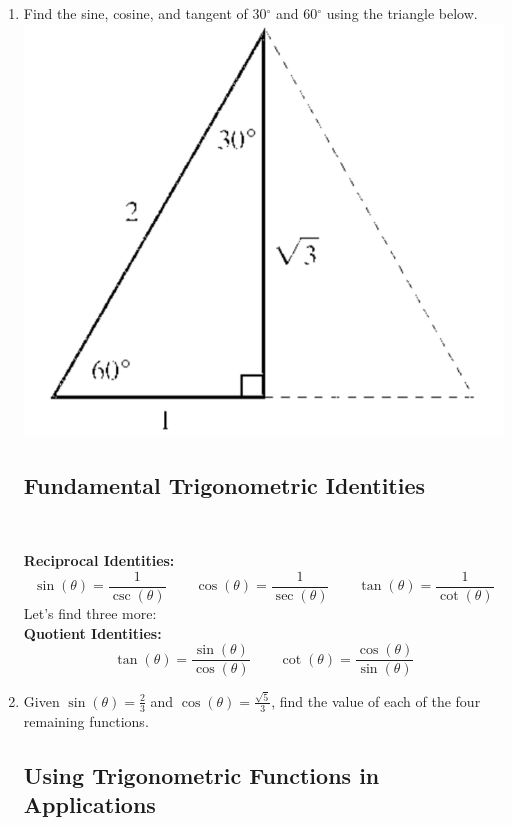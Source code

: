 \begin{enumerate}
\item Find the sine, cosine, and tangent of 30$^{\circ}$ and  60$^{\circ}$ using the triangle below.\\
\includegraphics[scale=.6]{trigex3}\\


\newpage

\subsection{Fundamental Trigonometric Identities} ~

\textbf{Reciprocal Identities:  }
$$\sin(\theta)=\frac{1}{\csc(\theta)} \quad \quad \cos(\theta)=\frac{1}{\sec(\theta)} \quad \quad \tan(\theta)=\frac{1}{\cot(\theta)}$$
Let's find three more:\\[.2in]

\textbf{Quotient Identities:  }
$$\tan(\theta)=\frac{\sin(\theta)}{\cos(\theta)} \quad \quad \cot(\theta)=\frac{\cos(\theta)}{\sin(\theta)}$$


\item Given $\sin(\theta)=\frac{2}{3}$ and $\cos(\theta)=\frac{\sqrt{5}}{3}$, find the value of each of the four remaining functions.\vfill
\vfill

\newpage
\subsection{Using Trigonometric Functions in Applications} ~


\end{enumerate}
